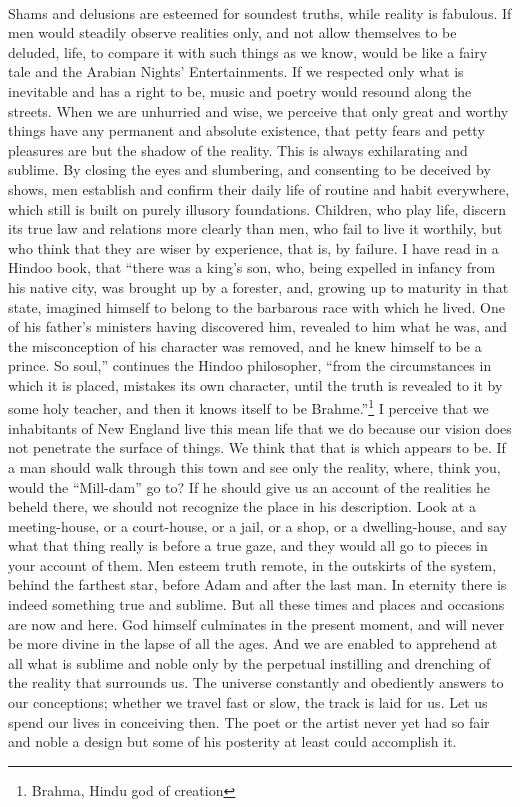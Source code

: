\documentclass[letterpaper,12pt]{article}
\begin{document}
\paragraph{} Shams and delusions are esteemed for soundest truths, while reality
is fabulous. If men would steadily observe realities only, and not allow
themselves to be deluded, life, to compare it with such things as we know, would
be like a fairy tale and the Arabian Nights' Entertainments. If we respected
only what is inevitable and has a right to be, music and poetry would resound
along the streets. When we are unhurried and wise, we perceive that only great
and worthy things have any permanent and absolute existence, that petty fears
and petty pleasures are but the shadow of the reality. This is always
exhilarating and sublime. By closing the eyes and slumbering, and consenting to
be deceived by shows, men establish and confirm their daily life of routine and
habit everywhere, which still is built on purely illusory foundations. Children,
who play life, discern its true law and relations more clearly than men, who
fail to live it worthily, but who think that they are wiser by experience, that
is, by failure. I have read in a Hindoo book, that \enquote{there was a king's
    son, who, being expelled in infancy from his native city, was brought up by
    a forester, and, growing up to maturity in that state, imagined himself to
    belong to the barbarous race with which he lived. One of his father's
    ministers having discovered him, revealed to him what he was, and the
    misconception of his character was removed, and he knew himself to be
    a prince. So soul,} continues the Hindoo philosopher, \enquote{from the
    circumstances in which it is placed, mistakes its own character, until the
    truth is revealed to it by some holy teacher, and then it knows itself to be
    Brahme.}\footnote{Brahma, Hindu god of creation} I perceive that we
inhabitants of New England live this mean life that we do because our vision
does not penetrate the surface of things. We think that that is which appears to
be. If a man should walk through this town and see only the reality, where,
think you, would the \enquote{Mill-dam} go to? If he should give us an account
of the realities he beheld there, we should not recognize the place in his
description. Look at a meeting-house, or a court-house, or a jail, or a shop, or
a dwelling-house, and say what that thing really is before a true gaze, and they
would all go to pieces in your account of them. Men esteem truth remote, in the
outskirts of the system, behind the farthest star, before Adam and after the
last man. In eternity there is indeed something true and sublime. But all these
times and places and occasions are now and here. God himself culminates in the
present moment, and will never be more divine in the lapse of all the ages. And
we are enabled to apprehend at all what is sublime and noble only by the
perpetual instilling and drenching of the reality that surrounds us. The
universe constantly and obediently answers to our conceptions; whether we travel
fast or slow, the track is laid for us. Let us spend our lives in conceiving
then. The poet or the artist never yet had so fair and noble a design but some
of his posterity at least could accomplish it.
\end{document}
